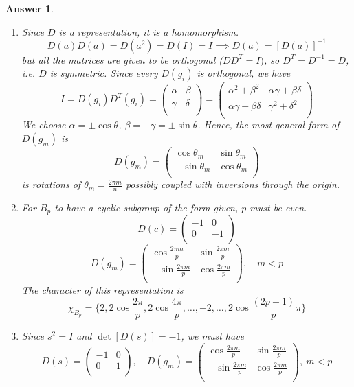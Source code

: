 \documentclass[a4paper]{article}
\newtheorem{ans}{Answer}[section]
\theoremstyle{new}
\begin{document}
\begin{ans}\leavevmode
\begin{enumerate}[label=(\alph*)]
\item Since $D$ is a representation, it is a homomorphism.
$$D(a)D(a)=D(a^2)=D(I)=I\implies D(a)=[D(a)]^{-1}$$
but all the matrices are given to be orthogonal ($DD^T=I)$, so $D^T=D^{-1}=D$, i.e. $D$ is symmetric. Since every $D(g_i)$ is orthogonal, we have
$$I=D(g_i)D^T(g_i)=\begin{pmatrix}\alpha&\beta\\\gamma&\delta\\\end{pmatrix}=\begin{pmatrix}\alpha^2+\beta^2&\alpha\gamma+\beta\delta\\\alpha\gamma+\beta\delta&\gamma^2+\delta^2\\\end{pmatrix}$$
We choose $\alpha=\pm\cos\theta$, $\beta=-\gamma=\pm\sin\theta$. Hence, the most general form of $D(g_m)$ is
$$D(g_m)=\begin{pmatrix}\cos\theta_m&\sin\theta_m\\-\sin\theta_m&\cos\theta_m\\\end{pmatrix}$$
is rotations of $\theta_m=\frac{2\pi m}{n}$ possibly coupled with inversions through the origin.
\item For $B_p$ to have a cyclic subgroup of the form given, $p$ must be even.
$$D(c)=\begin{pmatrix}-1&0\\0&-1\\\end{pmatrix}$$
$$D(g_m)=\begin{pmatrix}\cos\frac{2\pi m}{p}&\sin\frac{2\pi m}{p}\\-\sin\frac{2\pi m}{p}&\cos\frac{2\pi m}{p}\\\end{pmatrix},\quad m<p$$
The character of this representation is
$$\chi_{B_p}=\bigg\{2,2\cos\frac{2\pi}{p},2\cos\frac{4\pi}{p},\dots,-2,\dots,2\cos\frac{(2p-1)}{p}\pi\bigg\}$$
\newpage
\item Since $s^2=I$ and $\det[D(s)]=-1$, we must have
$$D(s)=\begin{pmatrix}-1&0\\0&1\\\end{pmatrix},\quad D(g_m)=\begin{pmatrix}\cos\frac{2\pi m}{p}&\sin\frac{2\pi m}{p}\\-\sin\frac{2\pi m}{p}&\cos\frac{2\pi m}{p}\\\end{pmatrix},~m<p$$

\end{enumerate}
\end{ans}
\end{document}
